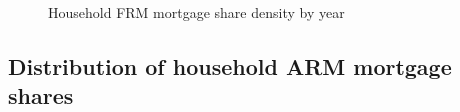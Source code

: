 \documentclass[
  letterpaper,
  DIV=11,
  numbers=noendperiod]{scrartcl}
\begin{document}
\begin{figure}[H]


\caption{\label{fig-frm_density_year}Household FRM mortgage share
density by year}

\end{figure}%

\subsection{Distribution of household ARM mortgage
shares}\label{distribution-of-household-arm-mortgage-shares}
\end{document}
